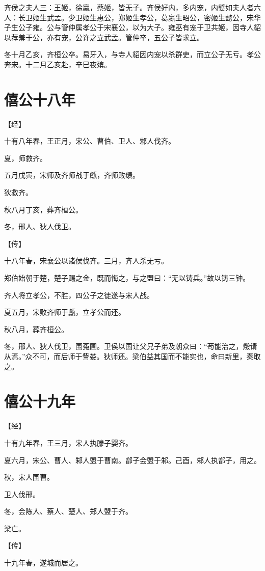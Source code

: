 \documentclass[a4paper,12pt,UTF8,twoside]{ctexbook}
\begin{document}
齐侯之夫人三：王姬，徐嬴，蔡姬，皆无子。齐侯好内，多内宠，内嬖如夫人者六人：长卫姬生武孟。少卫姬生惠公，郑姬生孝公，葛嬴生昭公，密姬生懿公，宋华子生公子雍。公与管仲属孝公于宋襄公，以为大子。雍巫有宠于卫共姬，因寺人貂以荐羞于公，亦有宠，公许之立武孟。管仲卒，五公子皆求立。

冬十月乙亥，齐桓公卒。易牙入，与寺人貂因内宠以杀群吏，而立公子无亏。孝公奔宋。十二月乙亥赴，辛巳夜殡。

\section{僖公十八年}



【经】

十有八年春，王正月，宋公、曹伯、卫人、邾人伐齐。

夏，师救齐。

五月戊寅，宋师及齐师战于甗，齐师败绩。

狄救齐。

秋八月丁亥，葬齐桓公。

冬，邢人、狄人伐卫。

【传】

十八年春，宋襄公以诸侯伐齐。三月，齐人杀无亏。

郑伯始朝于楚，楚子赐之金，既而悔之，与之盟曰：“无以铸兵。”故以铸三钟。

齐人将立孝公，不胜，四公子之徒遂与宋人战。

夏五月，宋败齐师于甗，立孝公而还。

秋八月，葬齐桓公。

冬，邢人、狄人伐卫，围菟圃。卫侯以国让父兄子弟及朝众曰：“苟能治之，燬请从焉。”众不可，而后师于訾娄。狄师还。梁伯益其国而不能实也，命曰新里，秦取之。


\section{僖公十九年}

【经】

十有九年春，王三月，宋人执滕子婴齐。

夏六月，宋公、曹人、邾人盟于曹南。鄫子会盟于邾。己酉，邾人执鄫子，用之。

秋，宋人围曹。

卫人伐邢。

冬，会陈人、蔡人、楚人、郑人盟于齐。

梁亡。

【传】

十九年春，遂城而居之。
\end{document}
